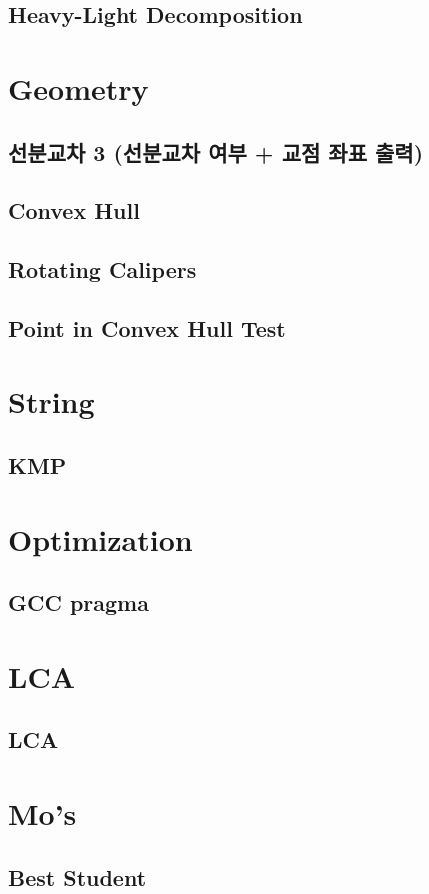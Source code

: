 \documentclass[10pt,landscape,a4paper,twocolumn]{article}
\begin{document}
\subsection{Heavy-Light Decomposition}


\section{Geometry}

\subsection{선분교차 3 (선분교차 여부 + 교점 좌표 출력)}


\subsection{Convex Hull}


\subsection{Rotating Calipers}


\subsection{Point in Convex Hull Test}


\section{String}
\subsection{KMP}


\section{Optimization}
\subsection{GCC pragma}


\section{LCA}
\subsection{LCA}


\section{Mo's}
\subsection{Best Student}

\end{document}
